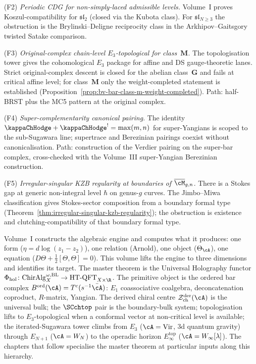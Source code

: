 (F2) \emph{Periodic CDG for non-simply-laced admissible levels.}
Volume~I proves Koszul-compatibility for $\mathfrak{sl}_2$ (closed
via the Kubota class). For $\mathfrak{sl}_{N \ge 3}$ the obstruction
is the Brylinski--Deligne reciprocity class in the Arkhipov--Gaitsgory
twisted Satake comparison.

(F3) \emph{Original-complex chain-level $E_3$-topological for
class~$\mathbf{M}$.} The topologisation tower gives the
cohomological $E_3$ package for affine and DS gauge-theoretic
lanes. Strict original-complex descent is closed for the abelian
class~$\mathbf{G}$ and fails at critical affine level; for
class~$\mathbf{M}$ only the weight-completed statement is
established
(Proposition~\ref{prop:bv-bar-class-m-weight-completed}). Path:
half-BRST plus the MC5 pattern at the original complex.

(F4) \emph{Super-complementarity canonical pairing.} The identity
$\kappaChHodge + {\kappaChHodge}^! = \max(m, n)$ for
super-Yangians is scoped to the sub-Sugawara line; supertrace and
Berezinian pairings coexist without canonicalisation. Path:
construction of the Verdier pairing on the super-bar complex,
cross-checked with the Volume~III
super-Yangian Berezinian construction.

(F5) \emph{Irregular-singular KZB regularity at boundaries of
$\overline{\cM}_{g,n}$.} There is a Stokes gap at generic
non-integral level $\hbar$ on genus-$g$ curves. The
Jimbo--Miwa classification gives Stokes-sector composition from a
boundary formal type
(Theorem~\ref{thm:irregular-singular-kzb-regularity}); the
obstruction is existence and clutching-compatibility of that boundary
formal type.

\bigskip

\noindent
Volume~I constructs the algebraic engine and computes what it
produces: one form ($\eta = d\log(z_1 - z_2)$), one relation
(Arnold), one object ($\Theta_\cA$), one equation
($D\Theta + \tfrac{1}{2}[\Theta, \Theta] = 0$). This volume
lifts the engine to three dimensions and identifies its target.
The master theorem is the Universal Holography functor
$\Phi_{\mathrm{hol}}\colon
\mathrm{ChirAlg}^{\omega,\mathrm{BL}}_X \to
\mathrm{HT\text{-}QFT}_{X \times \R}$. The primitive object is
the ordered bar complex
$B^{\mathrm{ord}}(\cA) = T^c(s^{-1}\bar\cA)$: $E_1$ coassociative
coalgebra, deconcatenation coproduct, $R$-matrix, Yangian. The
derived chiral centre $\cZ^{\mathrm{der}}_{\mathrm{ch}}(\cA)$ is
the universal bulk; the $\SCchtop$ pair is the boundary-bulk
system; topologisation lifts to $E_3$-topological when a
conformal vector at non-critical level is available; the
iterated-Sugawara tower climbs from $E_3$ ($\cA = \mathrm{Vir}$,
3d quantum gravity) through $E_{N+1}$ ($\cA = W_N$) to the
operadic horizon $E_\infty^{\mathrm{top}}$
($\cA = W_\infty[\lambda]$). The chapters that follow specialise
the master theorem at particular inputs along this hierarchy.

